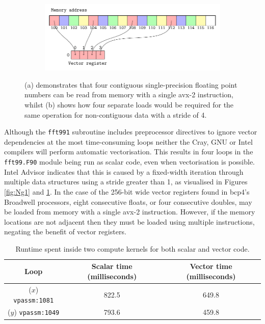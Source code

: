 \documentclass[a4paper,11pt]{report}
\begin{document}
\begin{figure}[htbp]\ContinuedFloat

\begin{subfigure}[b]{1\textwidth}
\centering
   \includegraphics[width=0.80\linewidth]{img/tikz-img/vector_registers_noncontiguous/vector_registers.pdf}
   \caption{}
   \label{fig:Ng2}
\end{subfigure}

\caption[Contiguous and non-contiguous memory access]{ (a) demonstrates that four contiguous single-precision floating point numbers can be read from memory with a single \gls{avx}-2 instruction, whilst (b) shows how four separate loads would be required for the same operation for non-contiguous data with a stride of 4.}
\label{fig:vector-registers} 
\end{figure}
\par
Although the \texttt{fft991} subroutine includes preprocessor directives to ignore vector dependencies at the most time-consuming loops neither the Cray, GNU or Intel compilers will perform automatic vectorisation. This results in four loops in the \texttt{fft99.F90} module being run as scalar code, even when vectorisation is possible. Intel Advisor indicates that this is caused by a fixed-width iteration through multiple data structures using a stride greater than 1, as visualised in Figures \ref{fig:Ng1} and \ref{fig:Ng2}. In the case of the 256-bit wide vector registers found in \gls{bcp4}'s Broadwell processors, eight consecutive floats, or four consecutive doubles, may be loaded from memory with a single \gls{avx}-2 instruction. However, if the memory locations are not adjacent then they must be loaded using multiple instructions, negating the benefit of vector registers. 
\par
\begin{table}[htp]
\caption{Runtime spent inside two compute kernels for both scalar and vector code.}
\begin{center}
\begin{tabular}{ c c c }
\toprule 		
\textbf{Loop}				&	\textbf{Scalar time (milliseconds)}	&	\textbf{Vector time (milliseconds)}	\\ 
\midrule
($x$) \texttt{vpassm:1081}		&	822.5						&	649.8				\\
($y$) \texttt{vpassm:1049}		&	793.6						&	459.8				\\
\bottomrule
\end{tabular}
\end{center}
\label{tbl:force-vec}
\end{table}
\end{document}
